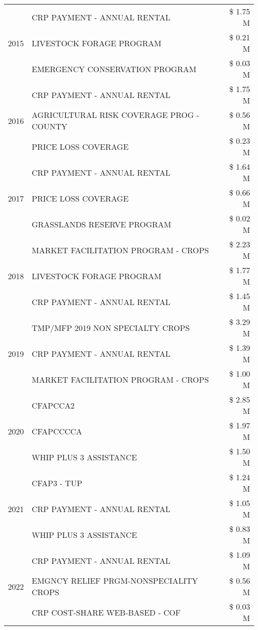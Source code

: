 \begin{tabular}{llr}
\cline{1-3}
\multirow[t]{3}{*}{2015} & CRP PAYMENT - ANNUAL RENTAL & \$ 1.75 M \\
 & LIVESTOCK FORAGE PROGRAM & \$ 0.21 M \\
 & EMERGENCY CONSERVATION PROGRAM & \$ 0.03 M \\
\cline{1-3}
\multirow[t]{3}{*}{2016} & CRP PAYMENT - ANNUAL RENTAL & \$ 1.75 M \\
 & AGRICULTURAL RISK COVERAGE PROG - COUNTY & \$ 0.56 M \\
 & PRICE LOSS COVERAGE & \$ 0.23 M \\
\cline{1-3}
\multirow[t]{3}{*}{2017} & CRP PAYMENT - ANNUAL RENTAL & \$ 1.64 M \\
 & PRICE LOSS COVERAGE & \$ 0.66 M \\
 & GRASSLANDS RESERVE PROGRAM & \$ 0.02 M \\
\cline{1-3}
\multirow[t]{3}{*}{2018} & MARKET FACILITATION PROGRAM - CROPS & \$ 2.23 M \\
 & LIVESTOCK FORAGE PROGRAM & \$ 1.77 M \\
 & CRP PAYMENT - ANNUAL RENTAL & \$ 1.45 M \\
\cline{1-3}
\multirow[t]{3}{*}{2019} & TMP/MFP 2019 NON SPECIALTY CROPS & \$ 3.29 M \\
 & CRP PAYMENT - ANNUAL RENTAL & \$ 1.39 M \\
 & MARKET FACILITATION PROGRAM - CROPS & \$ 1.00 M \\
\cline{1-3}
\multirow[t]{3}{*}{2020} & CFAPCCA2 & \$ 2.85 M \\
 & CFAPCCCCA & \$ 1.97 M \\
 & WHIP PLUS 3 ASSISTANCE & \$ 1.50 M \\
\cline{1-3}
\multirow[t]{3}{*}{2021} & CFAP3 - TUP & \$ 1.24 M \\
 & CRP PAYMENT - ANNUAL RENTAL & \$ 1.05 M \\
 & WHIP PLUS 3 ASSISTANCE & \$ 0.83 M \\
\cline{1-3}
\multirow[t]{3}{*}{2022} & CRP PAYMENT - ANNUAL RENTAL & \$ 1.09 M \\
 & EMGNCY RELIEF PRGM-NONSPECIALITY CROPS & \$ 0.56 M \\
 & CRP COST-SHARE WEB-BASED - COF & \$ 0.03 M \\
\cline{1-3}
\bottomrule
\end{tabular}
